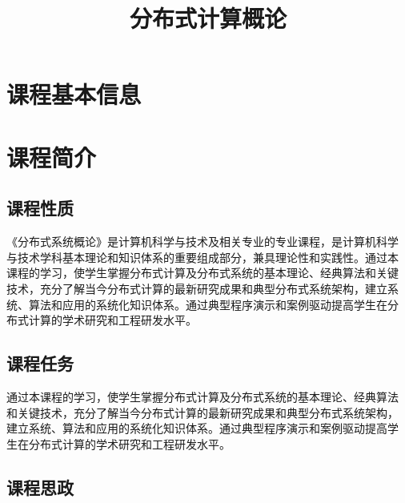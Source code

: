 \documentclass{swfusyllabus}
\title{分布式计算概论}
\begin{document}
\maketitle{}

\section{课程基本信息}

\basicinfo{}

\section{课程简介}

\subsection{课程性质}

《分布式系统概论》是计算机科学与技术及相关专业的专业课程，是计算机科学
与技术学科基本理论和知识体系的重要组成部分，兼具理论性和实践性。通过本
课程的学习，使学生掌握分布式计算及分布式系统的基本理论、经典算法和关键
技术，充分了解当今分布式计算的最新研究成果和典型分布式系统架构，建立系
统、算法和应用的系统化知识体系。通过典型程序演示和案例驱动提高学生在分
布式计算的学术研究和工程研发水平。

\subsection{课程任务}




通过本课程的学习，使学生掌握分布式计算及分布式系统的基本理论、经典算法
和关键技术，充分了解当今分布式计算的最新研究成果和典型分布式系统架构，
建立系统、算法和应用的系统化知识体系。通过典型程序演示和案例驱动提高学
生在分布式计算的学术研究和工程研发水平。

\subsection{课程思政}
\end{document}
